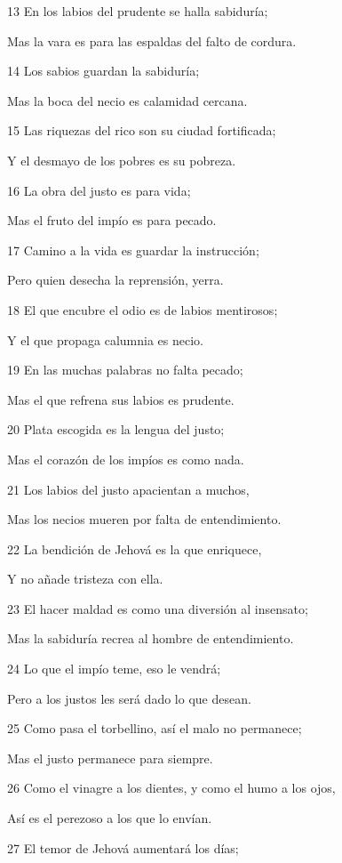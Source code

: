 \par 13 En los labios del prudente se halla sabiduría;
\par Mas la vara es para las espaldas del falto de cordura.
\par 14 Los sabios guardan la sabiduría;
\par Mas la boca del necio es calamidad cercana.
\par 15 Las riquezas del rico son su ciudad fortificada;
\par Y el desmayo de los pobres es su pobreza.
\par 16 La obra del justo es para vida;
\par Mas el fruto del impío es para pecado.
\par 17 Camino a la vida es guardar la instrucción;
\par Pero quien desecha la reprensión, yerra.
\par 18 El que encubre el odio es de labios mentirosos;
\par Y el que propaga calumnia es necio.
\par 19 En las muchas palabras no falta pecado;
\par Mas el que refrena sus labios es prudente.
\par 20 Plata escogida es la lengua del justo;
\par Mas el corazón de los impíos es como nada.
\par 21 Los labios del justo apacientan a muchos,
\par Mas los necios mueren por falta de entendimiento.
\par 22 La bendición de Jehová es la que enriquece,
\par Y no añade tristeza con ella.
\par 23 El hacer maldad es como una diversión al insensato;
\par Mas la sabiduría recrea al hombre de entendimiento.
\par 24 Lo que el impío teme, eso le vendrá;
\par Pero a los justos les será dado lo que desean.
\par 25 Como pasa el torbellino, así el malo no permanece;
\par Mas el justo permanece para siempre.
\par 26 Como el vinagre a los dientes, y como el humo a los ojos,
\par Así es el perezoso a los que lo envían.
\par 27 El temor de Jehová aumentará los días;
